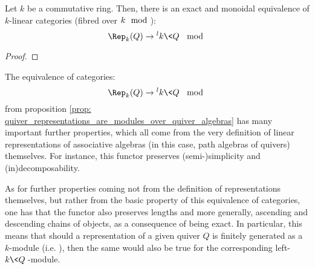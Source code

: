             \begin{proposition} \label{prop: quiver_representations_are_modules_over_quiver_algebras}
                Let $k$ be a commutative ring. Then, there is an exact and monoidal equivalence of $k$-linear categories (fibred over $k\mod$):
                    $$\Rep_{k}(Q) \to {}^lk\<Q\>\mod$$
            \end{proposition}
                \begin{proof}
                    
                \end{proof}
            \begin{remark}
                The equivalence of categories:
                    $$\Rep_{k}(Q) \to {}^lk\<Q\>\mod$$
                from proposition \ref{prop: quiver_representations_are_modules_over_quiver_algebras} has many important further properties, which all come from the very definition of linear representations of associative algebras (in this case, path algebras of quivers) themselves. For instance, this functor preserves (semi-)simplicity and (in)decomposability.
                
                As for further properties coming not from the definition of representations themselves, but rather from the basic property of this equivalence of categories, one has that the functor also preserves lengths and more generally, ascending and descending chains of objects, as a consequence of being exact. In particular, this means that should a representation of a given quiver $Q$ is finitely generated as a $k$-module (i.e. ), then the same would also be true for the corresponding left-$k\<Q\>$-module.
            \end{remark}
                

